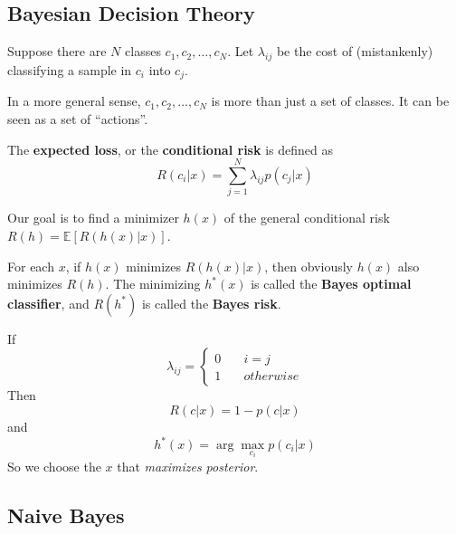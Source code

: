     \subsection{Bayesian Decision Theory}
        Suppose there are $N$ classes $c_1,c_2,\dots,c_N$. Let $\lambda_{ij}$ be the cost of (mistankenly) classifying a sample in $c_i$ into $c_j$.
        \begin{remark}
            In a more general sense, $c_1, c_2, \dots, c_N$ is more than just a set of classes. It can be seen as a set of ``actions''.
        \end{remark}

        \begin{definition}
            The \textbf{expected loss}, or the \textbf{conditional risk} is defined as
            \[ R(c_i|x) = \sum_{j=1}^N \lambda_{ij}p(c_j|x) \]
        \end{definition}
        Our goal is to find a minimizer $h(x)$ of the general conditional risk $R(h) = \mathbb{E}[R(h(x)|x)]$.

        For each $x$, if $h(x)$ minimizes $R(h(x)|x)$, then obviously $h(x)$ also minimizes $R(h)$. The minimizing $h^*(x)$ is called the \textbf{Bayes optimal classifier}, and $R(h^*)$ is called the \textbf{Bayes risk}.

        If
        \[
        \lambda_{ij} = 
        \begin{cases}
            0 \quad & i = j\\
            1 \quad & otherwise
        \end{cases}    
        \]
        Then
        \[ R(c|x) = 1 - p(c|x) \]
        and
        \[ h^*(x) = \arg \max_{c_i} p(c_i|x) \]
        So we choose the $x$ that \emph{maximizes posterior}.

    \subsection{Naive Bayes}
